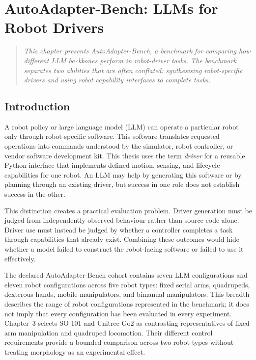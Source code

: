 \chapter[AutoAdapter-Bench]{AutoAdapter-Bench: LLMs for Robot Drivers}
\label{chapter:autoadapter-bench}

\begin{quote}\itshape
This chapter presents AutoAdapter-Bench, a benchmark for comparing how
different LLM backbones perform in robot-driver tasks. The benchmark separates
two abilities that are often conflated: synthesising robot-specific drivers and
using robot capability interfaces to complete tasks.
\end{quote}

\section[Introduction]{Introduction}

A robot policy or large language model (LLM) can operate a particular robot
only through robot-specific software. This software translates requested
operations into commands understood by the simulator, robot controller, or
vendor software development kit. This thesis uses the term \emph{driver} for
a reusable Python interface that implements defined motion, sensing, and
lifecycle capabilities for one robot. An LLM may help by generating this
software or by planning through an existing driver, but success in one role
does not establish success in the other.

This distinction creates a practical evaluation problem. Driver generation
must be judged from independently observed behaviour rather than source code
alone. Driver use must instead be judged by whether a controller completes a
task through capabilities that already exist. Combining these outcomes would
hide whether a model failed to construct the robot-facing software or failed
to use it effectively.

The declared AutoAdapter-Bench cohort contains seven LLM configurations and
eleven robot configurations across five robot types: fixed serial arms,
quadrupeds, dexterous hands, mobile manipulators, and bimanual manipulators.
This breadth describes the range of robot configurations represented in the
benchmark; it does not imply that every configuration has been evaluated in
every experiment. Chapter~3 selects SO-101 and Unitree Go2 as contrasting
representatives of fixed-arm manipulation and quadruped locomotion. Their
different control requirements provide a bounded comparison across two robot
types without treating morphology as an experimental effect.

